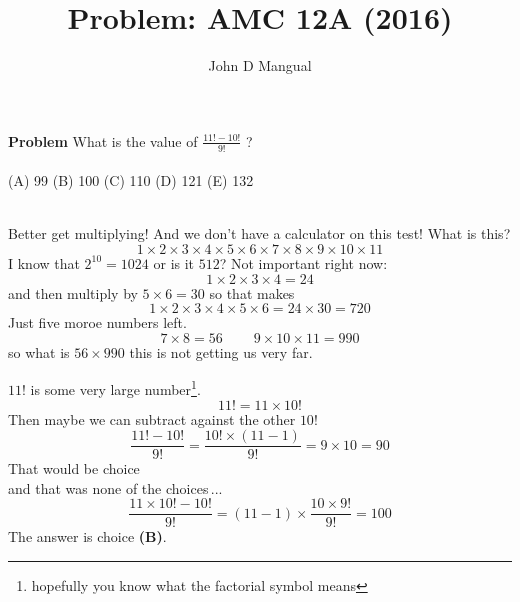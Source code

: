\documentclass[12pt]{article}
\title{\textbf{ Problem:  AMC 12A (2016)}}
\author{John D Mangual}
\date{}
\begin{document}
\selectfont \fontsize{25}{30}\selectfont

\maketitle

\noindent  \textbf{Problem} What is the value of $\displaystyle \frac{11!-10!}{9!} $ ? \\ \\
(A) 99 \; (B) 100 \; (C) 110 \; (D) 121 \; (E) 132

 \\
Better get multiplying!  And we don't have a calculator on this test!  What is this?
$$1 \times 2 \times 3 \times 4 \times 5
\times 6 \times 7 \times 8 \times 9 \times 10 \times 11 $$
I know that $2^{10} = 1024$ or is it $512$?  Not important right now:
$$ 1 \times 2 \times 3 \times 4 = 24 $$
and then multiply by $5 \times 6 = 30$ so that makes 
$$ 1 \times 2 \times 3 \times 4 \times 5
\times 6  = 24 \times 30 = 720$$
Just five moroe numbers left.
$$ 7 \times 8 = 56 \;\;\;\;\;\;\;\; 9\times 10 \times 11 = 990 $$
so what is $56 \times 990$ this is not getting us very far.

\newpage

\noindent $11!$ is some very large number\footnote{hopefully you know what the factorial symbol means}.
$$ 11! = 11 \times 10! $$
Then maybe we can subtract against the other $10!$
$$ \frac{11! - 10!}{9!}
= \frac{10! \times (11 - 1) }{9!} 
= 9 \times 10 = 90$$
That would be choice \\
and that was none of the choices\,...
$$ \frac{11 \times 10! - 10!}{9!} = (11 - 1) \times \frac{10 \times 9!}{9!}= 100$$
The answer is choice \textbf{(B)}.  
\end{document}
